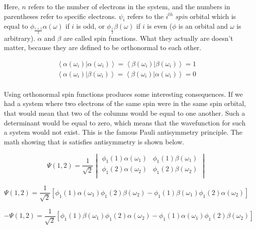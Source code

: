 \documentclass[12pt]{report}
\begin{document}
Here, $n$ refers to the number of electrons in the system, and the numbers in parentheses refer to specific electrons. $\psi_{i}$ refers to the $i^{th}$ \textit{spin} orbital which is equal to $\phi_{\frac{i+1}{2}}\alpha(\omega)$ if $i$ is odd, or $\phi_{\frac{i}{2}}\beta(\omega)$ if $i$ is even ($\phi$ is an orbital and $\omega$ is arbitrary). $\alpha$ and $\beta$ are called spin functions. What they actually are doesn't matter, because they are defined to be orthonormal to each other. 

\begin{equation}
\label{eq:a_b_def}
\begin{split}
\left<\alpha(\omega_{i})|\alpha(\omega_{i})\right> = \left<\beta(\omega_{i})|\beta(\omega_{i})\right> = 1	\\
\left<\alpha(\omega_{i})|\beta(\omega_{i})\right> = \left<\beta(\omega_{i})|\alpha(\omega_{i})\right> = 0	\\
\end{split}
\end{equation}

Using orthonormal spin functions produces some interesting consequences. If we had a system where two electrons of the same spin were in the same spin orbital, that would mean that two of the columns would be equal to one another. Such a determinant would be equal to zero, which means that the wavefunction for such a system would not exist. This is the famous Pauli antisymmetry principle\cite{Pauli1925}. The math showing that is satisfies antisymmetry is shown below\cite{Ostlund}.

\begin{equation}
\label{eq:pauli_2t_1}
\Psi(1,2) =
\frac{1}{\sqrt{2}}
\begin{vmatrix}
\phi_{1}(1)\alpha(\omega_{1})		&	\phi_{1}(1)\beta(\omega_{1})		\\
\phi_{1}(2)\alpha(\omega_{2})		&	\phi_{1}(2)\beta(\omega_{2})		\\
\end{vmatrix}
\end{equation}

\begin{equation}
\label{eq:pauli_2t_2}
\Psi(1,2) =
\frac{1}{\sqrt{2}}
\left[
\phi_{1}(1)\alpha(\omega_{1})\phi_{1}(2)\beta(\omega_{2}) -
\phi_{1}(1)\beta(\omega_{1})\phi_{1}(2)\alpha(\omega_{2})
\right]
\end{equation}

\begin{equation}
\label{eq:pauli_2t_3}
-\Psi(1,2) =
\frac{1}{\sqrt{2}}
\left[
\phi_{1}(1)\beta(\omega_{1})\phi_{1}(2)\alpha(\omega_{2}) -
\phi_{1}(1)\alpha(\omega_{1})\phi_{1}(2)\beta(\omega_{2})
\right]
\end{equation}
\end{document}
